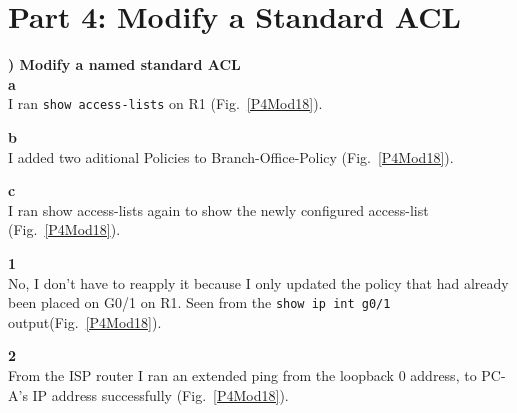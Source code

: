 \documentclass{report}
\newcommand{\mysection}[1]{\section*{#1}}
\newcommand{\mysubsection}[2]{\textbf{\romannumeral #1) #2}}
\begin{document}
\clearpage

\mysection{\textbf{Part 4: Modify a Standard ACL}}

\mysubsection{1}{Modify a named standard ACL}\\
{\bf{a}}\\
I ran {\scriptsize{\verb$show access-lists$}\normalsize} on
R1 (Fig.~\ref{P4Mod18}). 


{\bf{b}}\\
I added two aditional Policies to
Branch-Office-Policy (Fig.~\ref{P4Mod18}).


{\bf{c}}\\
I ran show access-lists again to show the newly configured
access-list (Fig.~\ref{P4Mod18}).

{\bf{1}}\\
No, I don't have to reapply it because I only updated the policy that had
already been placed on G0/1 on R1. Seen from the 
{\scriptsize{\verb$show ip int g0/1$}\normalsize}
output(Fig.~\ref{P4Mod18}).


{\bf{2}}\\
From the ISP router I ran an extended ping from the loopback 0 address, to
PC-A's IP address successfully (Fig.~\ref{P4Mod18}).
\end{document}

